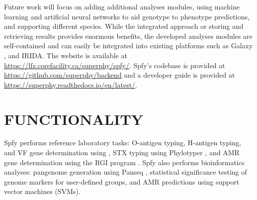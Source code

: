 \documentclass[a4,center,fleqn]{NAR}
\begin{document}
Future work will focus on adding additional analyses modules, using machine learning and artificial neural networks to aid genotype to phenotype predictions, and supporting different species. While the integrated approach or storing and retrieving results provides enormous benefits, the developed analyses modules are self-contained and can easily be integrated into existing platforms such as Galaxy \cite{goecks2010galaxy}, and IRIDA. The website is available at \url{https://lfz.corefacility.ca/superphy/spfy/}. Spfy's codebase is provided at \url{https://github.com/superphy/backend} and a developer guide is provided at \url{https://superphy.readthedocs.io/en/latest/}.



\enlargethispage{-65.1pt}



\section{FUNCTIONALITY}

Spfy performs reference laboratory tasks: O-antigen typing, H-antigen typing, and VF gene determination using , STX typing using Phylotyper \cite{whiteside2017phylotyper}, and AMR gene determination using the RGI program \cite{mcarthur2013comprehensive}. Spfy also performs bioinformatics analyses: pangenome generation using Panseq \cite{laing2010pan}, statistical significance testing of genome markers for user-defined groups, and AMR predictions using support vector machines (SVMs).
\end{document}
